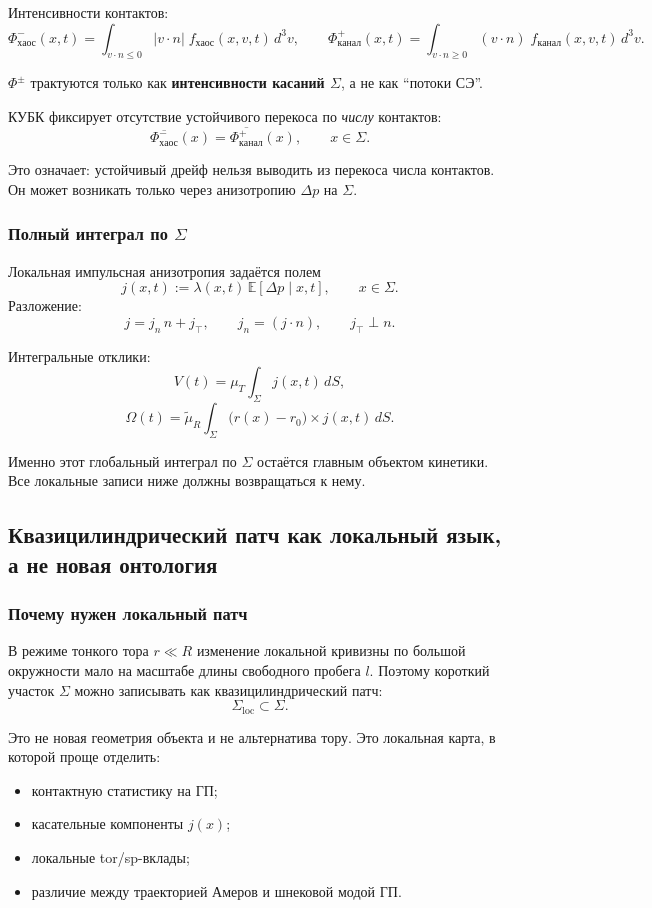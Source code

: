 Интенсивности контактов:
\[
\Phi^-_{\mathrm{хаос}}(x,t)=\int_{v\cdot n\le 0}|v\cdot n|\;f_{\mathrm{хаос}}(x,v,t)\,d^3v,\qquad
\Phi^+_{\mathrm{канал}}(x,t)=\int_{v\cdot n\ge 0}(v\cdot n)\;f_{\mathrm{канал}}(x,v,t)\,d^3v.
\]

\(\Phi^\pm\) трактуются только как \textbf{интенсивности касаний \(\Sigma\)}, а не как ``потоки СЭ''.

КУБК фиксирует отсутствие устойчивого перекоса по \emph{числу} контактов:
\[
\overline{\Phi^-_{\mathrm{хаос}}}(x)=\overline{\Phi^+_{\mathrm{канал}}}(x),\qquad x\in\Sigma.
\]

Это означает: устойчивый дрейф нельзя выводить из перекоса числа контактов. Он может возникать только через анизотропию \(\Delta p\) на \(\Sigma\).

\subsubsection{Полный интеграл по \(\Sigma\)}

Локальная импульсная анизотропия задаётся полем
\[
j(x,t):=\lambda(x,t)\,\mathbb{E}[\Delta p\mid x,t],\qquad x\in\Sigma.
\]
Разложение:
\[
j=j_n\,n+j_\top,\qquad j_n=(j\cdot n),\qquad j_\top\perp n.
\]

Интегральные отклики:
\[
V(t)=\mu_T\int_{\Sigma} j(x,t)\,dS,
\]
\[
\Omega(t)=\tilde\mu_R\int_{\Sigma}\bigl(r(x)-r_0\bigr)\times j(x,t)\,dS.
\]

Именно этот глобальный интеграл по \(\Sigma\) остаётся главным объектом кинетики. Все локальные записи ниже должны возвращаться к нему.

\subsection{Квазицилиндрический патч как локальный язык, а не новая онтология}

\subsubsection{Почему нужен локальный патч}

В режиме тонкого тора \(r\ll R\) изменение локальной кривизны по большой окружности мало на масштабе длины свободного пробега \(l\). Поэтому короткий участок \(\Sigma\) можно записывать как квазицилиндрический патч:
\[
\Sigma_{\mathrm{loc}}\subset\Sigma.
\]

Это не новая геометрия объекта и не альтернатива тору. Это локальная карта, в которой проще отделить:
\begin{itemize}
\item контактную статистику на ГП;
\item касательные компоненты \(j(x)\);
\item локальные tor/sp-вклады;
\item различие между траекторией Амеров и шнековой модой ГП.
\end{itemize}

